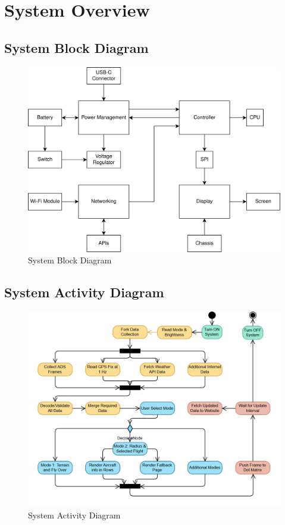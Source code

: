 \clearpage
\section{System Overview}
\subsection{System Block Diagram}
\begin{figure}[h]
    \centering
    \includegraphics[width=16cm]{images/block_diagram.png}
    \caption{System Block Diagram}
\end{figure}

\clearpage
\subsection{System Activity Diagram}
\begin{figure}[h]
    \centering
    \includegraphics[width=16cm]{images/systemactivitydiagram.png} %
    \caption{System Activity Diagram}
\end{figure}

